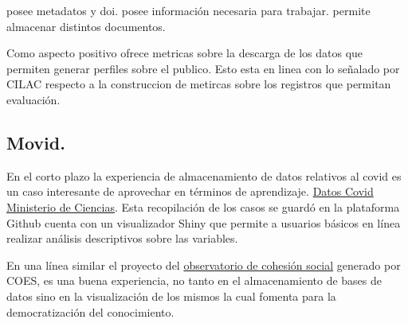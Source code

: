 \documentclass[
  14pt,
]{book}
\begin{document}
posee metadatos y doi. posee información necesaria para trabajar. permite almacenar distintos documentos.

Como aspecto positivo ofrece metricas sobre la descarga de los datos que permiten generar perfiles sobre el publico. Esto esta en linea con lo señalado por CILAC respecto a la construccion de metircas sobre los registros que permitan evaluación.

\hypertarget{movid.}{%
\subsection{Movid.}\label{movid.}}

En el corto plazo la experiencia de almacenamiento de datos relativos al covid es un caso interesante de aprovechar en términos de aprendizaje. \href{https://www.minciencia.gob.cl/covid19}{Datos Covid Ministerio de Ciencias}. Esta recopilación de los casos se guardó en la plataforma Github cuenta con un visualizador Shiny que permite a usuarios básicos en línea realizar análisis descriptivos sobre las variables.

En una línea similar el proyecto del \href{https://ocs-coes.netlify.app/app/}{observatorio de cohesión social} generado por COES, es una buena experiencia, no tanto en el almacenamiento de bases de datos sino en la visualización de los mismos la cual fomenta para la democratización del conocimiento.

  
\end{document}
